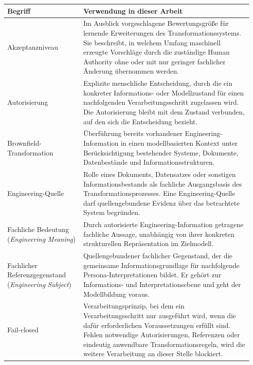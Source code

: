 \renewcommand{\arraystretch}{1.25}
\begin{xltabular}{\textwidth}
{>{\raggedright\arraybackslash}p{5.0cm}X}
\textbf{Begriff} & \textbf{Verwendung in dieser Arbeit} \\
\hline

Akzeptanzniveau &
Im Ausblick vorgeschlagene Bewertungsgröße für lernende Erweiterungen des
Transformationssystems. Sie beschreibt, in welchem Umfang maschinell
erzeugte Vorschläge durch die zuständige Human Authority ohne oder mit nur
geringer fachlicher Änderung übernommen werden. \\

Autorisierung &
Explizite menschliche Entscheidung, durch die ein konkreter Informations-
oder Modellzustand für einen nachfolgenden Verarbeitungsschritt zugelassen
wird. Die Autorisierung bleibt mit dem Zustand verbunden, auf den sich die
Entscheidung bezieht. \\

Brownfield-Transformation &
Überführung bereits vorhandener Engineering-Information in einen
modellbasierten Kontext unter Berücksichtigung bestehender Systeme,
Dokumente, Datenbestände und Informationsstrukturen. \\

Engineering-Quelle &
Rolle eines Dokuments, Datensatzes oder sonstigen Informationsbestands als
fachliche Ausgangsbasis des Transformationsprozesses. Eine
Engineering-Quelle darf quellengebundene Evidenz über das betrachtete System
begründen. \\

Fachliche Bedeutung (\emph{Engineering Meaning}) &
Durch autorisierte Engineering-Information getragene fachliche Aussage,
unabhängig von ihrer konkreten strukturellen Repräsentation im Zielmodell. \\

Fachlicher Referenzgegenstand (\emph{Engineering Subject}) &
Quellengebundener fachlicher Gegenstand, der die gemeinsame
Informationsgrundlage für nachfolgende Persona-Interpretationen bildet.
Er gehört zur Informations- und Interpretationsebene und geht der
Modellbildung voraus. \\

Fail-closed &
Verarbeitungsprinzip, bei dem ein Verarbeitungsschritt nur ausgeführt wird,
wenn die dafür erforderlichen Voraussetzungen erfüllt sind. Fehlen
notwendige Autorisierungen, Referenzen oder eindeutig anwendbare
Transformationsregeln, wird die weitere Verarbeitung an dieser Stelle
blockiert. \\


\end{xltabular}
